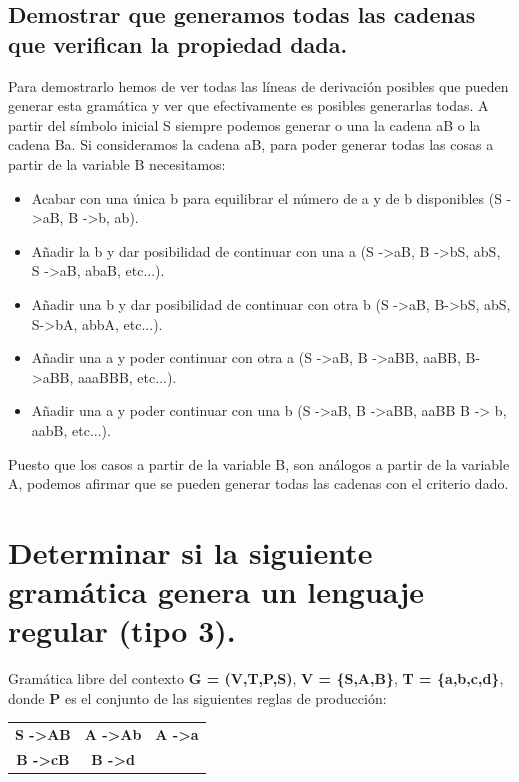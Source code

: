 \subsection{Demostrar que generamos todas las cadenas que verifican la propiedad dada.}
Para demostrarlo hemos de ver todas las líneas de derivación posibles que pueden generar esta gramática y ver que efectivamente es posibles generarlas todas. A partir del símbolo inicial S siempre podemos generar o una la cadena aB o la cadena Ba. Si consideramos la cadena aB, para poder generar todas las cosas a partir de la variable B necesitamos:
\begin{itemize}
	\item Acabar con una única b para equilibrar el número de a y de b disponibles (S ->\space aB, B ->\space b, ab).
	\item Añadir la b y dar posibilidad de continuar con una a (S ->\space aB, B ->\space bS, abS, S ->\space aB, abaB, etc...).
	\item Añadir una b y dar posibilidad de continuar con otra b (S ->\space aB, B->\space bS, abS, S->\space bA, abbA, etc...).
	\item Añadir una a y poder continuar con otra a (S ->\space aB, B ->\space aBB, aaBB, B->\space aBB, aaaBBB, etc...).
	\item Añadir una a y poder continuar con una b (S ->\space aB, B ->\space aBB, aaBB B -> \space b, aabB, etc...).
\end{itemize}

Puesto que los casos a partir de la variable B, son análogos a partir de la variable A, podemos afirmar que se pueden generar todas las cadenas con el criterio dado.

\section{Determinar si la siguiente gramática genera un lenguaje regular (tipo 3).}

Gramática libre del contexto \textbf{G = (V,T,P,S)}, \textbf{V = \{S,A,B\}}, \textbf {T = \{a,b,c,d\}}, donde \textbf{P} es el conjunto de las siguientes reglas de producción: \newline

\begin{table}[H]
	\centering
	\begin{tabular}{lcc}
		\textbf{S -\textgreater \space AB}                     & \textbf{A -\textgreater \space Ab} & \textbf{A -\textgreater \space a} \\
		\multicolumn{1}{c}{\textbf{B -\textgreater \space cB}} & \textbf{B -\textgreater \space d}  & \textbf{}                 
	\end{tabular}
\end{table}

